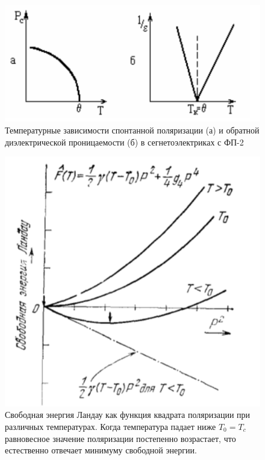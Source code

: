 \documentclass[a4paper]{article}
\begin{document}
\begin{figure}[H]
\begin{center}
\includegraphics[scale = 0.7]{p5.png}

\caption{Температурные зависимости спонтанной поляризации (а) и обратной диэлектрической проницаемости (б) в сегнетоэлектриках с ФП-2}
\label{p5}
\end{center}
\end{figure} 

\begin{figure}[H]
\begin{center}
\includegraphics[scale = 0.7]{p6.png}
\caption{Свободная энергия Ландау как функция квадрата поляризации при различных температурах. Когда температура падает ниже $T_0 = T_c$ равновесное значение поляризации постепенно возрастает, что естественно отвечает минимуму свободной энергии.}
\label{p6}
\end{center}
\end{figure}
\end{document}
